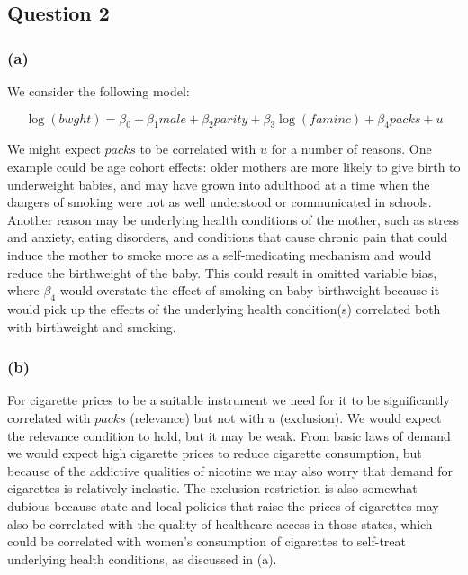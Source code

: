 \documentclass[
]{article}
\begin{document}
\newpage

\hypertarget{question-2}{%
\subsection{Question 2}\label{question-2}}

\hypertarget{a}{%
\subsubsection{(a)}\label{a}}

We consider the following model:

\[ \log(bwght) = \beta_0 + \beta_1 male + \beta_2 parity + \beta_3 \log(faminc) + \beta_4 packs + u \]

We might expect \(packs\) to be correlated with \(u\) for a number of
reasons. One example could be age cohort effects: older mothers are more
likely to give birth to underweight babies, and may have grown into
adulthood at a time when the dangers of smoking were not as well
understood or communicated in schools. Another reason may be underlying
health conditions of the mother, such as stress and anxiety, eating
disorders, and conditions that cause chronic pain that could induce the
mother to smoke more as a self-medicating mechanism and would reduce the
birthweight of the baby. This could result in omitted variable bias,
where \(\beta_4\) would overstate the effect of smoking on baby
birthweight because it would pick up the effects of the underlying
health condition(s) correlated both with birthweight and smoking.

\hypertarget{b}{%
\subsubsection{(b)}\label{b}}

For cigarette prices to be a suitable instrument we need for it to be
significantly correlated with \(packs\) (relevance) but not with \(u\)
(exclusion). We would expect the relevance condition to hold, but it may
be weak. From basic laws of demand we would expect high cigarette prices
to reduce cigarette consumption, but because of the addictive qualities
of nicotine we may also worry that demand for cigarettes is relatively
inelastic. The exclusion restriction is also somewhat dubious because
state and local policies that raise the prices of cigarettes may also be
correlated with the quality of healthcare access in those states, which
could be correlated with women's consumption of cigarettes to self-treat
underlying health conditions, as discussed in (a).
\end{document}
